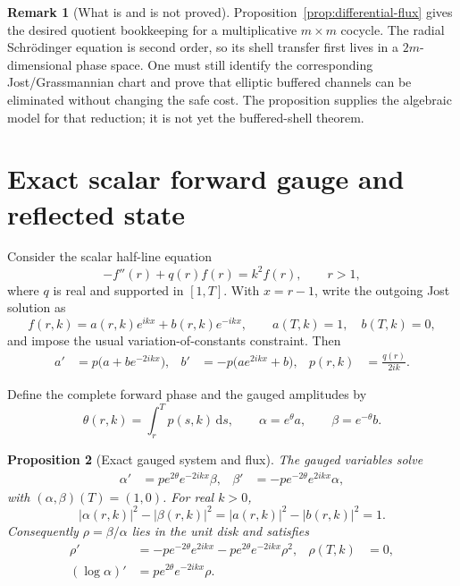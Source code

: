 \documentclass[11pt]{article}
\newcommand{\dd}{\,\mathrm d}
\newtheorem{proposition}{Proposition}[section]
\theoremstyle{definition}
\newtheorem{remark}[proposition]{Remark}
\begin{document}
\begin{remark}[What is and is not proved]
Proposition~\ref{prop:differential-flux} gives the desired quotient
bookkeeping for a multiplicative $m\times m$ cocycle.  The radial
Schr\"odinger equation is second order, so its shell transfer first lives in a
$2m$-dimensional phase space.  One must still identify the corresponding
Jost/Grassmannian chart and prove that elliptic buffered channels can be
eliminated without changing the safe cost.  The proposition supplies the
algebraic model for that reduction; it is not yet the buffered-shell theorem.
\end{remark}

\section{Exact scalar forward gauge and reflected state}

Consider the scalar half-line equation
\begin{equation}
 -f''(r)+q(r)f(r)=k^2f(r),
 \qquad r>1,
 \label{eq:scalar-schrodinger}
\end{equation}
where $q$ is real and supported in $[1,T]$.  With $x=r-1$, write the outgoing
Jost solution as
\begin{equation}
 f(r,k)=a(r,k)e^{ikx}+b(r,k)e^{-ikx},
 \qquad a(T,k)=1,\quad b(T,k)=0,
 \label{eq:ab-representation}
\end{equation}
and impose the usual variation-of-constants constraint.  Then
\begin{align}
 a'&=p\bigl(a+b e^{-2ikx}\bigr),
 &b'&=-p\bigl(ae^{2ikx}+b\bigr),
 &p(r,k)&=\frac{q(r)}{2ik}.
 \label{eq:ab-system}
\end{align}

Define the complete forward phase and the gauged amplitudes by
\begin{equation}
 \theta(r,k)=\int_r^T p(s,k)\dd s,
 \qquad
 \alpha=e^\theta a,
 \qquad
 \beta=e^{-\theta}b.
 \label{eq:scalar-gauge}
\end{equation}

\begin{proposition}[Exact gauged system and flux]
\label{prop:scalar-gauge}
The gauged variables solve
\begin{align}
 \alpha'
 &=p e^{2\theta}e^{-2ikx}\beta,
 &\beta'
 &=-p e^{-2\theta}e^{2ikx}\alpha,
 \label{eq:gauged-ab}
\end{align}
with $(\alpha,\beta)(T)=(1,0)$.  For real $k>0$,
\begin{equation}
 |\alpha(r,k)|^2-|\beta(r,k)|^2
 =|a(r,k)|^2-|b(r,k)|^2=1.
 \label{eq:scalar-flux}
\end{equation}
Consequently $\rho=\beta/\alpha$ lies in the unit disk and satisfies
\begin{align}
 \rho'
 &=-p e^{-2\theta}e^{2ikx}
   -p e^{2\theta}e^{-2ikx}\rho^2,
 &\rho(T,k)&=0,
 \label{eq:rho-riccati}\\
 (\log\alpha)'
 &=p e^{2\theta}e^{-2ikx}\rho.
 \label{eq:log-alpha}
\end{align}
\end{proposition}
\end{document}
